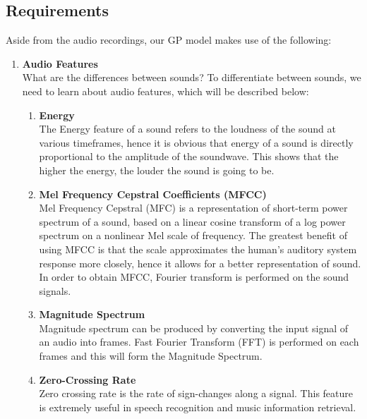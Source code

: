 \documentclass{article}
\begin{document}
	\subsection{Requirements}
	Aside from the audio recordings, our GP model makes use of the following:
	\begin{enumerate}
		\item \textbf{Audio Features}	\\
		What are the differences between sounds? To differentiate between sounds, we need to learn about audio features, which will be described below:\\
		\begin{enumerate}

			\item \textbf{Energy}	\\
			The Energy feature of a sound refers to the loudness of the sound at various timeframes, 
			hence it is obvious that energy of a sound is directly proportional to the amplitude of the soundwave. 
			This shows that the higher the energy, the louder the sound is going to be.	
		
			\item \textbf{Mel Frequency Cepstral Coefficients (MFCC)} \\
			Mel Frequency Cepstral (MFC) is a representation of short-term power spectrum of a sound, 
			based on a linear cosine transform of a log power spectrum on a nonlinear Mel scale of frequency. 
			The greatest benefit of using MFCC is that the scale approximates the 
			human's auditory system response more closely, hence it allows for a better representation of sound. 
			In order to obtain MFCC, Fourier transform is performed on the sound signals.	
		
			\item \textbf{Magnitude Spectrum} \\
			Magnitude spectrum can be produced by converting the input signal of an audio into frames. 
			Fast Fourier Transform (FFT) is performed on each frames and this will form the Magnitude Spectrum.
			
			\item \textbf{Zero-Crossing Rate} \\
			Zero crossing rate is the rate of sign-changes along a signal. This feature is extremely useful in speech recognition and music information retrieval.
		\end{enumerate}
		

\end{enumerate}
\end{document}
